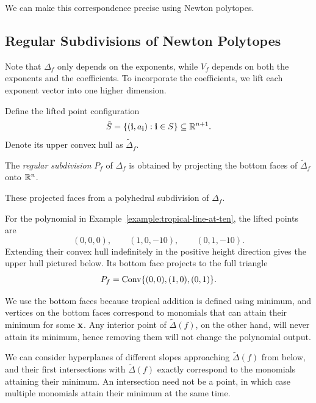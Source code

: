 \documentclass[../../main.tex]{subfiles}
\begin{document}
We can make this correspondence precise using Newton polytopes.

\subsection{Regular Subdivisions of Newton Polytopes}

Note that $\Delta_f$ only depends on the exponents, while $V_f$ depends on both the exponents and the coefficients. To incorporate the coefficients, we lift each exponent vector into one higher dimension.

\begin{defin}
    Define the lifted point configuration
    \[\tilde S=\{(\mathbf{i},a_{\mathbf{i}}):\mathbf{i} \in S\}\subseteq \mathbb{R}^{n+1}.\]
    Denote its upper convex hull as $\tilde{\Delta}_f$.
\end{defin}

\begin{defin}
    The \textit{regular subdivision} $P_f$ of $\Delta_f$ is obtained by projecting the bottom faces of $\tilde{\Delta}_f$ onto $\mathbb{R}^n$. 

    These projected faces from a polyhedral subdivision of $\Delta_f$. 
\end{defin}

\begin{example} \label{example:tropical-line-subdivision}
    For the polynomial in Example~\ref{example:tropical-line-at-ten}, the lifted points are
    \[(0,0,0),\qquad (1,0,-10),\qquad (0,1,-10).\]
    Extending their convex hull indefinitely in the positive height direction gives the upper hull pictured below. Its bottom face projects to the full triangle
    \[P_f=\operatorname{Conv}\{(0,0),(1,0),(0,1)\}.\]

    \TropicalLiftAndSubdivisionFigure
\end{example}

\begin{rmk}
    We use the bottom faces because tropical addition is defined using minimum, and vertices on the bottom faces correspond to monomials that can attain their minimum for some $\mathbf{x}$. Any interior point of $\tilde{\Delta}(f)$, on the other hand, will never attain its minimum, hence removing them will not change the polynomial output.

    We can consider hyperplanes of different slopes approaching $\tilde{\Delta}(f)$ from below, and their first intersections with $\tilde{\Delta}(f)$ exactly correspond to the monomials attaining their minimum. An intersection need not be a point, in which case multiple monomials attain their minimum at the same time.
\end{rmk}
\end{document}
